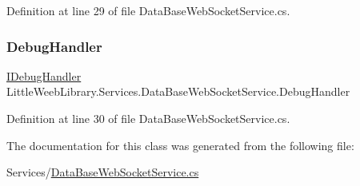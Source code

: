 Definition at line 29 of file Data\+Base\+Web\+Socket\+Service.\+cs.

\mbox{\label{class_little_weeb_library_1_1_services_1_1_data_base_web_socket_service_a6ad3d83d94358db7e6bee7e31f97899a}} 
\subsubsection{\texorpdfstring{Debug\+Handler}{DebugHandler}}
{\footnotesize\ttfamily \mbox{\hyperlink{interface_little_weeb_library_1_1_handlers_1_1_i_debug_handler}{I\+Debug\+Handler}} Little\+Weeb\+Library.\+Services.\+Data\+Base\+Web\+Socket\+Service.\+Debug\+Handler\hspace{0.3cm}{\ttfamily [private]}}



Definition at line 30 of file Data\+Base\+Web\+Socket\+Service.\+cs.



The documentation for this class was generated from the following file\+:\begin{DoxyCompactItemize}
\item 
Services/\mbox{\hyperlink{_data_base_web_socket_service_8cs}{Data\+Base\+Web\+Socket\+Service.\+cs}}\end{DoxyCompactItemize}
